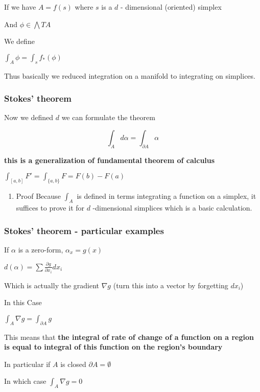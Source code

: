 \documentclass[11pt]{article}
\begin{document}
If we have \(A = f(s)\) where \(s\) is a \(d\) - dimensional (oriented) simplex

And \(\phi \in \bigwedge TA\)

We define

\(\int_A \phi = \int_s f_{*}(\phi)\)

Thus basically we reduced integration on a manifold to integrating on simplices.

\subsubsection{Stokes' theorem}
\label{sec:orgefbf849}

Now we defined \(d\) we can formulate the theorem

$$\int_A d\alpha = \int_{\partial A} \alpha$$

\textbf{\textbf{this is a generalization of fundamental theorem of calculus}}

\(\int_{[a,b]} F' = \int_{\{a,b\}} F = F(b) - F(a)\)

\begin{enumerate}
\item Proof
\label{sec:org6b41b54}
Because \(\int_A\) is defined in terms integrating a function on a simplex,
it suffices to prove it for \(d\) -dimensional simplices
which is a basic calculation.
\end{enumerate}

\subsubsection{Stokes' theorem - particular examples}
\label{sec:orge7bd661}

If \(\alpha\) is a zero-form, \(\alpha_x = g(x)\)

\(d(\alpha) = \sum \frac{\partial g}{\partial x_i} dx_i\)

Which is actually the gradient \(\nabla g\) (turn this into a vector by forgetting \(dx_{i}\))

In this Case

\(\int_A \nabla g = \int_{\partial A} g\)

This means that \textbf{\textbf{the integral of rate of change of a function on a region is equal to integral of this function on the region's boundary}}

In particular if \(A\) is closed \(\partial A = \emptyset\)

In which case \(\int_A \nabla g = 0\)
\end{document}
